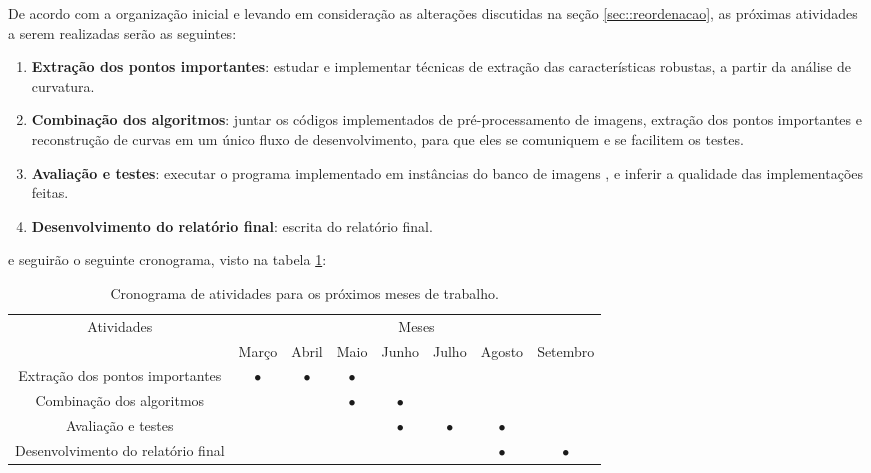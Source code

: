 De acordo com a organização inicial e levando em consideração as alterações discutidas na seção \ref{sec::reordenacao}, as próximas atividades a serem realizadas serão as seguintes:

\begin{enumerate}[noitemsep]
	\item \textbf{Extração dos pontos importantes}: estudar e implementar técnicas de extração das características robustas, a partir da análise de curvatura.
	\item \textbf{Combinação dos algoritmos}: juntar os códigos implementados de pré-processamento de imagens, extração dos pontos importantes e reconstrução de curvas em um único fluxo de desenvolvimento, para que eles se comuniquem e se facilitem os testes.
	\item \textbf{Avaliação e testes}: executar o programa implementado em instâncias do banco de imagens , e inferir a qualidade das implementações feitas.
	\item \textbf{Desenvolvimento do relatório final}: escrita do relatório final.
\end{enumerate}

\noindent e seguirão o seguinte cronograma, visto na tabela \ref{tab:proxcronograma}:

\begin{table}[htb]
	\footnotesize
	\centering
	\vspace{0.5em}
	\setlength{\tabcolsep}{0.05in}
	\begin{tabular}{|c|c|c|c|c|c|c|c|}
		\hline
		Atividades
		& \multicolumn{7}{c|}{Meses} \\
		\cline{2-8}
		& Março & Abril & Maio & Junho & Julho & Agosto & Setembro \\ \hline
		Extração dos pontos importantes & $\bullet$ & $\bullet$ & $\bullet$ & & & & \\ \hline
		Combinação dos algoritmos & & & $\bullet$ & $\bullet$ & & & \\ \hline
		Avaliação e testes & & & & $\bullet$ & $\bullet$ & $\bullet$ & \\ \hline
		Desenvolvimento do relatório final & & & & & & $\bullet$ & $\bullet$ \\ \hline
	\end{tabular}
	\caption{Cronograma de atividades para os próximos meses de trabalho.}
	\label{tab:proxcronograma}
\end{table}